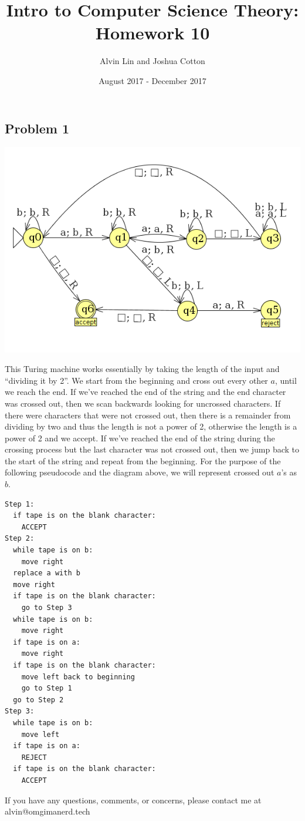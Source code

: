 \documentclass{math}
\title{Intro to Computer Science Theory: Homework 10}
\author{Alvin Lin and Joshua Cotton}
\date{August 2017 - December 2017}
\begin{document}
\maketitle

\subsection*{Problem 1}
\begin{center}
  \includegraphics[width=16cm]{assets/hw_10_1.png}
\end{center}
This Turing machine works essentially by taking the length of the input and
``dividing it by 2''. We start from the beginning and cross out every
other \( a \), until we reach the end. If we've reached the end of the string
and the end character was crossed out, then we scan backwards looking for
uncrossed characters. If there were characters that were not crossed out, then
there is a remainder from dividing by two and thus the length is not a power
of 2, otherwise the length is a power of 2 and we accept. If we've reached the
end of the string during the crossing process but the last character was not
crossed out, then we jump back to the start of the string and repeat from the
beginning. For the purpose of the following pseudocode and the diagram above,
we will represent crossed out \( a \)'s as \( b \).
\begin{lstlisting}
Step 1:
  if tape is on the blank character:
    ACCEPT
Step 2:
  while tape is on b:
    move right
  replace a with b
  move right
  if tape is on the blank character:
    go to Step 3
  while tape is on b:
    move right
  if tape is on a:
    move right
  if tape is on the blank character:
    move left back to beginning
    go to Step 1
  go to Step 2
Step 3:
  while tape is on b:
    move left
  if tape is on a:
    REJECT
  if tape is on the blank character:
    ACCEPT
\end{lstlisting}

\begin{center}
  If you have any questions, comments, or concerns, please contact me at
  alvin@omgimanerd.tech
\end{center}
\end{document}

